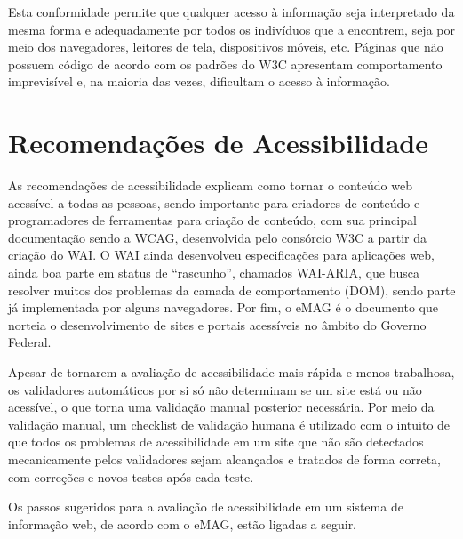 \documentclass[
  12pt,
  openright,
  twoside,
  a4paper,
  english,
  french,
  spanish,
  brazil
]{abntex2}
\begin{document}
Esta conformidade permite que qualquer acesso à informação seja interpretado da
mesma forma e adequadamente por todos os indivíduos que a encontrem, seja por
meio dos navegadores, leitores de tela, dispositivos móveis, etc. Páginas que
não possuem código de acordo com os padrões do W3C apresentam comportamento
imprevisível e, na maioria das vezes, dificultam o acesso à informação.

\section{Recomendações de Acessibilidade}

As recomendações de acessibilidade explicam como tornar o conteúdo web acessível
a todas as pessoas, sendo importante para criadores de conteúdo e programadores
de ferramentas para criação de conteúdo, com sua principal documentação sendo a
WCAG, desenvolvida pelo consórcio W3C a partir da criação do WAI. O WAI ainda
desenvolveu especificações para aplicações web, ainda boa parte em status de
``rascunho'', chamados WAI-ARIA, que busca resolver muitos dos problemas da
camada de comportamento (DOM), sendo parte já implementada por alguns
navegadores. Por fim, o eMAG é o documento que norteia o desenvolvimento de
sites e portais acessíveis no âmbito do Governo Federal.

Apesar de tornarem a avaliação de acessibilidade mais rápida e menos trabalhosa,
os validadores automáticos por si só não determinam se um site está ou não
acessível, o que torna uma validação manual posterior necessária. Por meio da
validação manual, um checklist de validação humana é utilizado com o intuito de
que todos os problemas de acessibilidade em um site que não são detectados
mecanicamente pelos validadores sejam alcançados e tratados de forma correta,
com correções e novos testes após cada teste.

Os passos sugeridos para a avaliação de acessibilidade em um sistema de
informação web, de acordo com o eMAG, estão ligadas a seguir.
\end{document}
